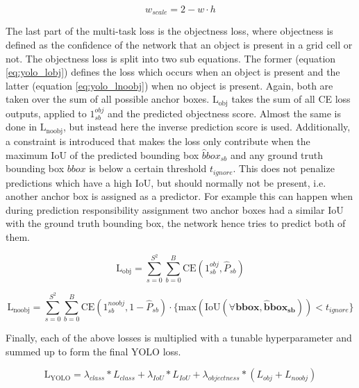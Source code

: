\begin{equation}
    w_{scale} = 2 - w \cdot h
\end{equation}

The last part of the multi-task loss is the objectness loss, where objectness is defined as the confidence of the network that an object is present in a grid cell or not.
The objectness loss is split into two sub equations.
The former (equation \ref{eq:yolo_lobj}) defines the loss which occurs when an object is present and the latter (equation \ref{eq:yolo_lnoobj}) when no object is present.
Again, both are taken over the sum of all possible anchor boxes.
$\text{L}_{\text{obj}}$ takes the sum of all \ac{CE} loss outputs, applied to $1_{sb}^{obj}$ and the predicted objectness score.
Almost the same is done in $\text{L}_{\text{noobj}}$, but instead here the inverse prediction score is used.
Additionally, a constraint is introduced that makes the loss only contribute when the maximum \ac{IoU} of the predicted bounding box $\hat{b}box_{sb}$ and any ground truth bounding box $bbox$ is below a certain threshold $t_{ignore}$.
This does not penalize predictions which have a high \ac{IoU}, but should normally not be present, i.e. another anchor box is assigned as a predictor.
For example this can happen when during prediction responsibility assignment two anchor boxes had a similar \ac{IoU} with the ground truth bounding box, the network hence tries to predict both of them.

\begin{equation}
    \text{L}_{\text{obj}} = \sum_{s=0}^{S^2}\sum_{b=0}^{B} \text{CE}(1^{obj}_{sb}, \hat{P}_{sb})
    \label{eq:yolo_lobj}
\end{equation}

\begin{equation}
    \text{L}_{\text{noobj}} = \sum_{s=0}^{S^2}\sum_{b=0}^{B} \text{CE}(1^{noobj}_{sb}, 1 - \hat{P}_{sb}) \cdot \{\text{max}(\text{IoU}(\forall \mathbf{bbox}, \mathbf{\hat{b}box_{sb}})) < t_{ignore}\}
    \label{eq:yolo_lnoobj}
\end{equation}


Finally, each of the above losses is multiplied with a tunable hyperparameter and summed up to form the final \ac{YOLO} loss.

\begin{equation}
    \text{L}_{\text{YOLO}} = \lambda_{class} * L_{class} + \lambda_{IoU} * L_{IoU} + \lambda_{objectness} * (L_{obj} + L_{noobj})
    \label{eq:yolo_loss}
\end{equation}

